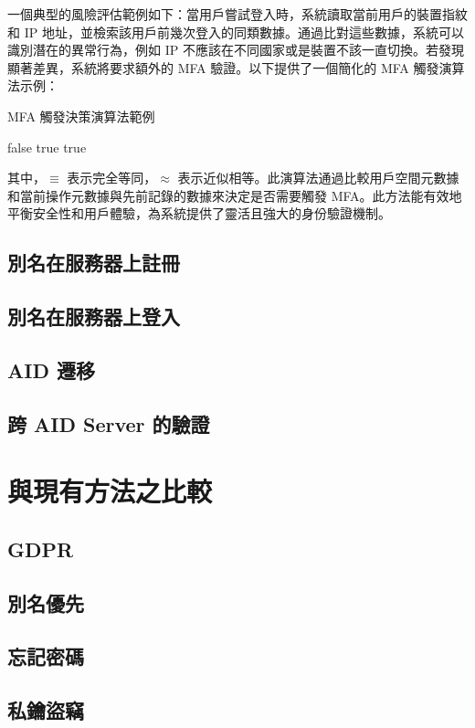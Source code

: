 一個典型的風險評估範例如下：當用戶嘗試登入時，系統讀取當前用戶的裝置指紋和 IP 地址，並檢索該用戶前幾次登入的同類數據。通過比對這些數據，系統可以識別潛在的異常行為，例如 IP 不應該在不同國家或是裝置不該一直切換。若發現顯著差異，系統將要求額外的 MFA 驗證。以下提供了一個簡化的 MFA 觸發演算法示例：

\begin{algorithm}
  \caption{MFA 觸發決策演算法範例}
  \begin{algorithmic}[1]
    \State \Return false
    \Else
    \State \Return true
    \EndIf
    \EndIf
    \State \Return true
    \EndFunction
  \end{algorithmic}
\end{algorithm}

其中，$\equiv$ 表示完全等同，$\approx$ 表示近似相等。此演算法通過比較用戶空間元數據和當前操作元數據與先前記錄的數據來決定是否需要觸發 MFA。此方法能有效地平衡安全性和用戶體驗，為系統提供了靈活且強大的身份驗證機制。

\subsection{別名在服務器上註冊}
\subsection{別名在服務器上登入}
\subsection{AID 遷移}
\subsection{跨 AID Server 的驗證}

\section{與現有方法之比較}
\subsection{GDPR}
\subsection{別名優先}
\subsection{忘記密碼}
\subsection{私鑰盜竊}
